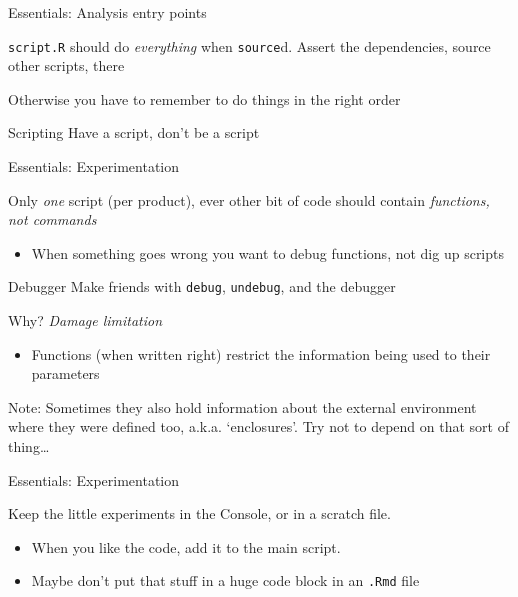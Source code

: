 \documentclass{hertieteaching}
\begin{document}
\begin{frame}{Essentials: Analysis entry points}

\texttt{script.R} should do \textit{everything} when \texttt{source}d. Assert the dependencies, source other scripts, there

Otherwise you have to remember to do things in the right order

\begin{block}{Scripting}
Have a script, don't be a script
\end{block}

\end{frame}
\begin{frame}{Essentials: Experimentation}

Only \textit{one} script (per product), ever other bit of code should contain \textit{functions, not commands}
\begin{itemize}
  \item When something goes wrong you want to debug functions, not dig up scripts
\end{itemize}

\begin{block}{Debugger}
Make friends with \texttt{debug}, \texttt{undebug}, and the debugger
\end{block}

Why? \textit{Damage limitation}
\begin{itemize}
  \item Functions (when written right) restrict the information being used to their parameters
\end{itemize}



Note: Sometimes they also hold information about the external environment where they were defined too, a.k.a. `enclosures'. Try not to depend on that sort of thing\ldots 

\end{frame}

\begin{frame}{Essentials: Experimentation}

Keep the little experiments in the Console, or in a scratch file.
\begin{itemize}
  \item When you like the code, add it to the main script.
  \item Maybe don't put that stuff in a huge code block in an \texttt{.Rmd} file
\end{itemize}

\end{frame}
\end{document}
